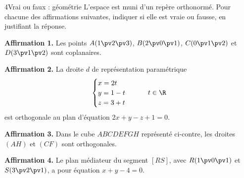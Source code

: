 \begin{exoBac}{4}{Vrai ou faux : géométrie}
L'espace est muni d'un repère orthonormé. Pour chacune des affirmations suivantes, indiquer si elle est vraie ou fausse, en justifiant
la réponse.
\begin{questions}
  \item \textbf{Affirmation 1.} Les points $A(1\pv2\pv3)$, $B(2\pv0\pv1)$, $C(0\pv1\pv2)$ et $D(3\pv1\pv2)$ sont coplanaires.
  \item \textbf{Affirmation 2.} La droite $d$ de représentation paramétrique
    \[\begin{cases}x=2t\\y=1-t\\z=3+t\end{cases}\qquad t\in\R\]
    est orthogonale au plan d'équation $2x+y-z+1=0$.
\end{questions}
\begin{codecote}[0.68]
\begin{questions}[start=3]
  \item \textbf{Affirmation 3.} Dans le cube $ABCDEFGH$ représenté ci-contre, les droites $(AH)$ et $(CF)$ sont orthogonales.
  \item \textbf{Affirmation 4.} Le plan médiateur du segment $[RS]$, avec $R(1\pv0\pv1)$ et $S(3\pv2\pv1)$, a pour équation
    $x+y-4=0$.
\end{questions}
\cote
\centering
{}
\end{codecote}
\end{exoBac}

